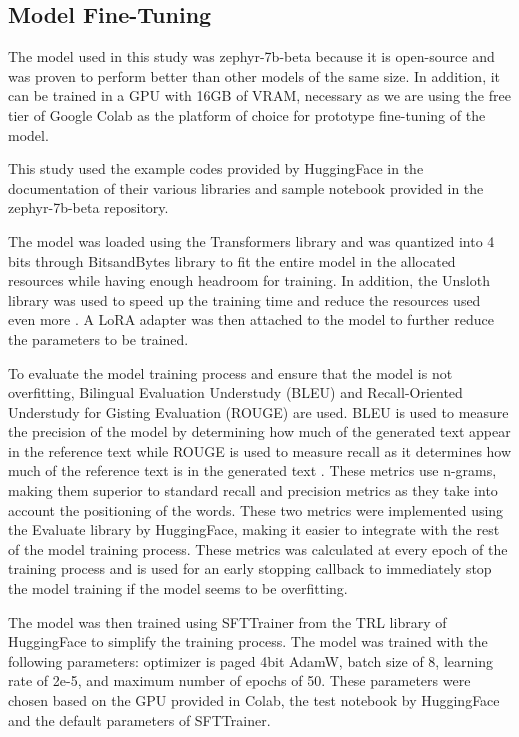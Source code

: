 \subsection{Model Fine-Tuning}
The model used in this study was zephyr-7b-beta because it is open-source and was proven to perform better than other models of the same size. In addition, it can be trained in a GPU with 16GB of VRAM, necessary as we are using the free tier of Google Colab as the platform of choice for prototype fine-tuning of the model.

This study used the example codes provided by HuggingFace in the documentation of their various libraries and sample notebook provided in the zephyr-7b-beta repository. 

The model was loaded using the Transformers library and was quantized into 4 bits through BitsandBytes library to fit the entire model in the allocated resources while having enough headroom for training. In addition, the Unsloth library was used to speed up the training time and reduce the resources used even more \cite{unsloth}. A LoRA adapter was then attached to the model to further reduce the parameters to be trained.

To evaluate the model training process and ensure that the model is not overfitting, Bilingual Evaluation Understudy (BLEU) and Recall-Oriented Understudy for Gisting Evaluation (ROUGE) are used. BLEU is used to measure the precision of the model by determining how much of the generated text appear in the reference text \cite{papineni_roukos_ward_zhu_2001} while ROUGE is used to measure recall as it determines how much of the reference text is in the generated text \cite{lin_2004}. These metrics use n-grams, making them superior to standard recall and precision metrics as they take into account the positioning of the words. These two metrics were implemented using the Evaluate library by HuggingFace, making it easier to integrate with the rest of the model training process. These metrics was calculated at every epoch of the training process and is used for an early stopping callback to immediately stop the model training if the model seems to be overfitting.

The model was then trained using SFTTrainer from the TRL library of HuggingFace to simplify the training process. The model was trained with the following parameters: optimizer is paged 4bit AdamW, batch size of 8, learning rate of 2e-5, and maximum number of epochs of 50. These parameters were chosen based on the GPU provided in Colab, the test notebook by HuggingFace and the default parameters of SFTTrainer.

